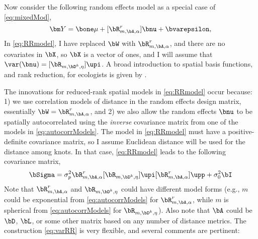 Now consider the following random effects model as a special case of \ref{eq:mixedMod},
\begin{equation} \label{eq:RRmodel}
	\bm Y = \bone\mu + [\bR^r_{m,\bA,\alpha}]\bnu + \bvarepsilon,
\end{equation}
In \ref{eq:RRmodel}, I have replaced $\bW$ with $\bR_{m,\bA,\alpha}^r$, and there are no covariates in $\bX$, so $\bX$ is a vector of ones, and I will assume that $\var(\bnu)=[\bR_{m,\bD^k,\eta}]\upi$.  A broad introduction to spatial basis functions, and rank reduction, for ecologists is given by \citet{Hefl:Brom:Bros:Bude:basi:2016}.

The innovations for reduced-rank spatial models in \ref{eq:RRmodel} occur because: 1) we use correlation models of distance in the random effects design matrix, essentially $\bW = \bR^r_{m,\bA,\alpha}$, and 2) we also allow the random effects $\bnu$ to be spatially autocorrelated using the \emph{inverse} covariance matrix from one of the models in \ref{eq:autocorrModels}.  The model in \ref{eq:RRmodel} must have a positive-definite covariance matrix, so I assume Euclidean distance will be used for the distance among knots.  In that case, \ref{eq:RRmodel} leads to the following covariance matrix,
\begin{equation} \label{eq:varRR}
				\bSigma = \sigma^2_p\bR^r_{m,\bA,\alpha}[\bR_{m,\bD^k,\eta}]\upi[\bR^r_{m,\bA,\alpha}]\upp + \sigma^2_0\bI
\end{equation}
Note that $\bR^r_{m,\bA,\alpha}$ and $\bR_{m,\bD^k,\eta}$ could have different model forms (e.g., $m$ could be exponential from \ref{eq:autocorrModels} for $\bR^r_{m,\bA,\alpha}$, while $m$ is spherical from \ref{eq:autocorrModels} for $\bR_{m,\bD^k,\eta}$). Also note that $\bA$ could be $\bD$, $\bL$, or some other matrix based on any number of distance metrics.  The construction \ref{eq:varRR} is very flexible, and several comments are pertinent:
